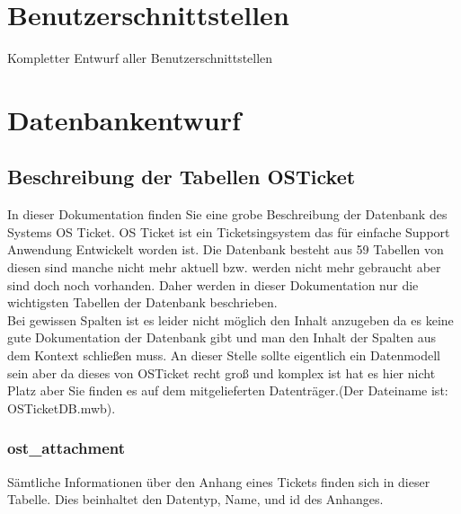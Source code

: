 \section{Benutzerschnittstellen} 
Kompletter Entwurf aller Benutzerschnittstellen

\section{Datenbankentwurf}
\def \currentAuthor{Elias Gabl}

\subsection{Beschreibung der Tabellen OSTicket}

In dieser Dokumentation finden Sie eine grobe Beschreibung der Datenbank des Systems OS Ticket. OS Ticket ist ein Ticketsingsystem das für einfache Support Anwendung Entwickelt worden ist. Die Datenbank besteht aus 59 Tabellen von diesen sind manche nicht mehr aktuell bzw. werden nicht mehr gebraucht aber sind doch noch vorhanden. Daher werden in dieser Dokumentation nur die wichtigsten Tabellen der Datenbank beschrieben.\\
Bei gewissen Spalten ist es leider nicht möglich den Inhalt anzugeben da es keine gute Dokumentation der Datenbank gibt und man den Inhalt der Spalten aus dem Kontext schließen muss.
\newline
\newline
An dieser Stelle sollte eigentlich ein Datenmodell sein aber da dieses von OSTicket recht groß und komplex ist hat es hier nicht Platz aber Sie finden es auf dem mitgelieferten Datenträger.(Der Dateiname ist: OSTicketDB.mwb).

\subsubsection{ost\_attachment}

Sämtliche Informationen über den Anhang eines Tickets finden sich in dieser Tabelle. Dies beinhaltet den Datentyp, Name, und id des Anhanges. 

